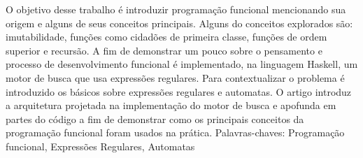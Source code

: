 O objetivo desse trabalho é introduzir programação funcional mencionando sua origem e alguns de seus conceitos principais.
Alguns do conceitos explorados são: imutabilidade, funções como cidadões de primeira classe, funções de ordem superior e recursão.
A fim de demonstrar um pouco sobre o pensamento e processo de desenvolvimento funcional é implementado, na linguagem Haskell, um motor de busca que usa expressões regulares.
Para contextualizar o problema é introduzido os básicos sobre expressões regulares e automatas.
O artigo introduz a arquitetura projetada na implementação do motor de busca e apofunda em partes do código a fim de demonstrar como os principais conceitos da programação funcional foram usados na prática.
Palavras-chaves: Programação funcional, Expressões Regulares, Automatas
